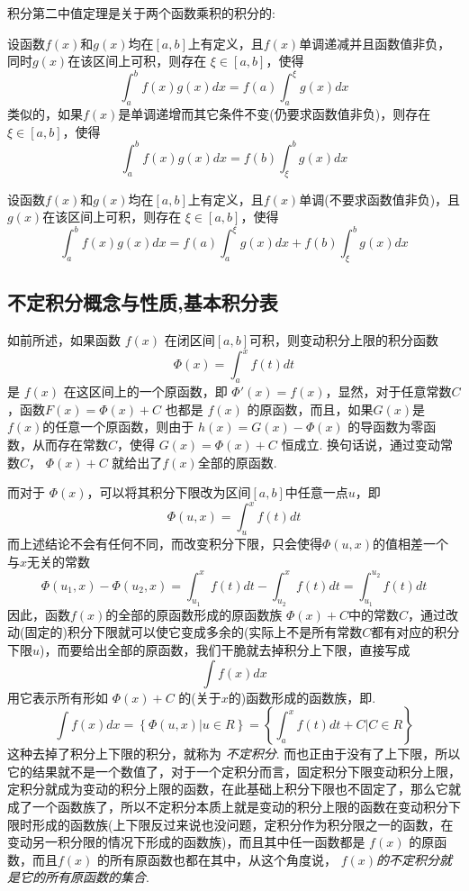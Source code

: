 积分第二中值定理是关于两个函数乘积的积分的:
\begin{theorem}[积分第二中值定理]
  设函数$f(x)$和$g(x)$均在$[a,b]$上有定义，且$f(x)$单调递减并且函数值非负，同时$g(x)$在该区间上可积，则存在 $\xi \in [a,b]$，使得
  \[ \int_a^{b} f(x)g(x)dx=f(a)\int_a^{\xi}g(x)dx \]
  类似的，如果$f(x)$是单调递增而其它条件不变(仍要求函数值非负)，则存在$\xi \in [a,b]$，使得
  \[ \int_a^{b} f(x)g(x)dx=f(b)\int_{\xi}^{b}g(x)dx \]
\end{theorem}

\begin{inference}
  设函数$f(x)$和$g(x)$均在$[a,b]$上有定义，且$f(x)$单调(不要求函数值非负)，且$g(x)$在该区间上可积，则存在 $\xi \in [a,b]$，使得
  \[ \int_a^{b}f(x)g(x)dx = f(a)\int_a^{\xi}g(x)dx+f(b)\int_{\xi}^{b}g(x)dx \]
\end{inference}


\subsection{不定积分概念与性质,基本积分表}
\label{sec:indefinite-integral}

如前所述，如果函数 $f(x)$ 在闭区间$[a,b]$可积，则变动积分上限的积分函数
\[ \Phi(x) = \int_a^x f(t) dt \]
是 $f(x)$ 在这区间上的一个原函数，即 $\Phi'(x) = f(x)$，显然，对于任意常数$C$，函数$F(x) = \Phi(x)+C$ 也都是 $f(x)$ 的原函数，而且，如果$G(x)$是 $f(x)$的任意一个原函数，则由于 $h(x)=G(x) - \Phi(x)$ 的导函数为零函数，从而存在常数$C$，使得 $G(x) = \Phi(x)+C$ 恒成立. 换句话说，通过变动常数$C$， $\Phi(x)+C$ 就给出了$f(x)$全部的原函数.

而对于 $\Phi(x)$，可以将其积分下限改为区间$[a,b]$中任意一点$u$，即
\[ \Phi(u,x) = \int_u^x f(t) dt \]
而上述结论不会有任何不同，而改变积分下限，只会使得$\Phi(u,x)$的值相差一个与$x$无关的常数
\[ \Phi(u_1,x)-\Phi(u_2,x) = \int_{u_1}^x f(t) dt - \int_{u_2}^x f(t) dt = \int_{u_1}^{u_2} f(t) dt \]
因此，函数$f(x)$的全部的原函数形成的原函数族 $\Phi(x)+C$中的常数$C$，通过改动(固定的)积分下限就可以使它变成多余的(实际上不是所有常数$C$都有对应的积分下限$u$)，而要给出全部的原函数，我们干脆就去掉积分上下限，直接写成
\[ \int f(x) dx \]
用它表示所有形如 $\Phi(x)+C$ 的(关于$x$的)函数形成的函数族，即.
\[ \int f(x) dx = \left\{ \Phi(u,x) \left|  \right. u \in R \right\} = \left\{ \int_a^x f(t) dt +C \left| C \in R \right. \right\} \]
这种去掉了积分上下限的积分，就称为 \emph{不定积分}. 而也正由于没有了上下限，所以它的结果就不是一个数值了，对于一个定积分而言，固定积分下限变动积分上限，定积分就成为变动的积分上限的函数，在此基础上积分下限也不固定了，那么它就成了一个函数族了，所以不定积分本质上就是变动的积分上限的函数在变动积分下限时形成的函数族(上下限反过来说也没问题，定积分作为积分限之一的函数，在变动另一积分限的情况下形成的函数族)，而且其中任一函数都是 $f(x)$ 的原函数，而且$f(x)$ 的所有原函数也都在其中，从这个角度说，\emph{ $f(x)$的不定积分就是它的所有原函数的集合}.












